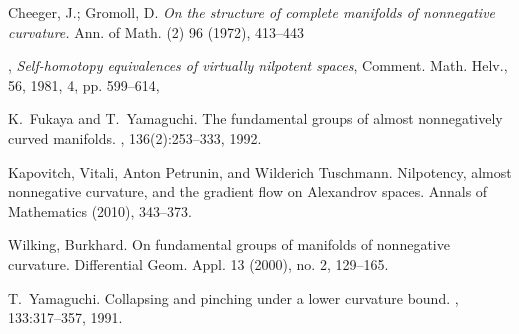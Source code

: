 \documentclass{amsart}
\begin{document}
\small

%


\begin{thebibliography}{HMR75}

Cheeger, J.; Gromoll, D.
 \textit{On the structure of complete manifolds of nonnegative curvature.}
Ann. of Math. (2) 96 (1972), 413--443

,
 \textit{Self-homotopy equivalences of virtually nilpotent spaces},
{Comment. Math. Helv.},
{56},
{1981},
{4},
pp. {599--614},

K.~Fukaya and T.~Yamaguchi.
\newblock The fundamental groups of almost nonnegatively curved manifolds.
, 136(2):253--333, 1992.


 Kapovitch, Vitali, Anton Petrunin, and Wilderich Tuschmann. 
\newblock Nilpotency, almost nonnegative curvature, and the gradient flow on Alexandrov spaces. 
\newblock Annals of Mathematics (2010), 343--373.

Wilking, Burkhard. \newblock On fundamental groups of manifolds of nonnegative curvature. \newblock  Differential Geom. Appl.  13  (2000),  no. 2, 129--165.

T.~Yamaguchi.
\newblock Collapsing and pinching under a lower curvature bound.
, 133:317--357, 1991.
\end{thebibliography}
\end{document}
